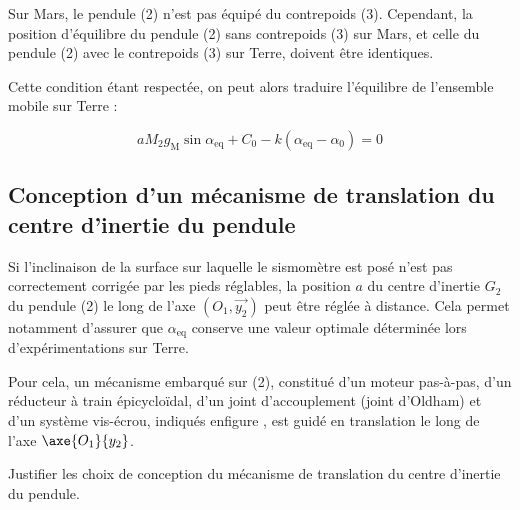 Sur Mars, le pendule (2) n'est pas équipé du contrepoids (3). Cependant, la position d'équilibre du pendule (2) sans contrepoids (3) sur Mars, et celle du pendule (2) avec le contrepoids (3) sur Terre, doivent être identiques.


Cette condition étant respectée, on peut alors traduire l'équilibre de l'ensemble mobile sur Terre :


$$
a M_{2} g_{\mathrm{M}} \sin \alpha_{\mathrm{eq}}+C_{0}-k\left(\alpha_{\mathrm{eq}}-\alpha_{0}\right)=0 %
$$


\subsection{Conception d'un mécanisme de translation du centre d'inertie du pendule}
Si l'inclinaison de la surface sur laquelle le sismomètre est posé n'est pas correctement corrigée par les pieds réglables, la position $a$ du centre d'inertie $G_{2}$ du pendule (2) le long de l'axe $\left(O_{1}, \overrightarrow{y_{2}}\right)$ peut être réglée à distance. Cela permet notamment d'assurer que $\alpha_{\mathrm{eq}}$ conserve une valeur optimale déterminée lors d'expérimentations sur Terre.

Pour cela, un mécanisme embarqué sur (2), constitué d'un moteur pas-à-pas, d'un réducteur à train épicycloïdal, d'un joint d'accouplement (joint d'Oldham) et d'un système vis-écrou, indiqués enfigure \label{ccmp2023_fig_04}, est guidé en translation le long de l'axe  $\axe{O_1}{y_2}$.

\begin{obj}
Justifier les choix de conception du mécanisme de translation du centre d'inertie du pendule.
\end{obj}



